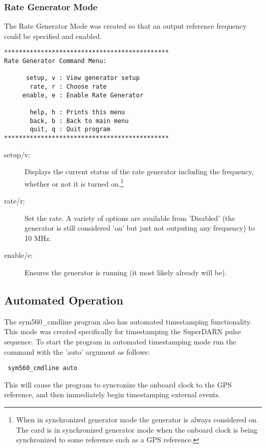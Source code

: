 \documentclass[11pt]{article}
\begin{document}
\subsubsection{Rate Generator Mode} \label{rategen}
The Rate Generator Mode was created so that an output reference frequency could be specified and enabled.
\begin{verbatim}
*********************************************
Rate Generator Command Menu:

      setup, v : View generator setup
       rate, r : Choose rate
     enable, e : Enable Rate Generator

       help, h : Prints this menu
       back, b : Back to main menu
       quit, q : Quit program
*********************************************
\end{verbatim}
\begin{description}
 \item [setup/v:] Displays the current status of the rate generator including the frequency, whether or not it is turned on.\footnote{When in synchronized generator mode the generator is always considered on.  The card is in synchronized generator mode when the onboard clock is being synchronized to some reference such as a GPS reference.}
 \item [rate/r:] Set the rate.  A variety of options are available from 'Disabled' (the generator is still considered 'on' but just not outputing any frequency) to 10 MHz.
 \item [enable/e:] Ensures the generator is running (it most likely already will be).
\end{description}




\subsection{Automated Operation} \label{autoapp}
The sym560\_cmdline program also has automated timestamping functionality.  This mode was created specifically for timestamping the SuperDARN pulse sequence.  To start the program in automated timestamping mode run the command with the 'auto' argument as follows:
\begin{verbatim}
 sym560_cmdline auto
\end{verbatim}
This will cause the program to syncronize the onboard clock to the GPS reference, and then immediately begin timestamping external events.
\end{document}
